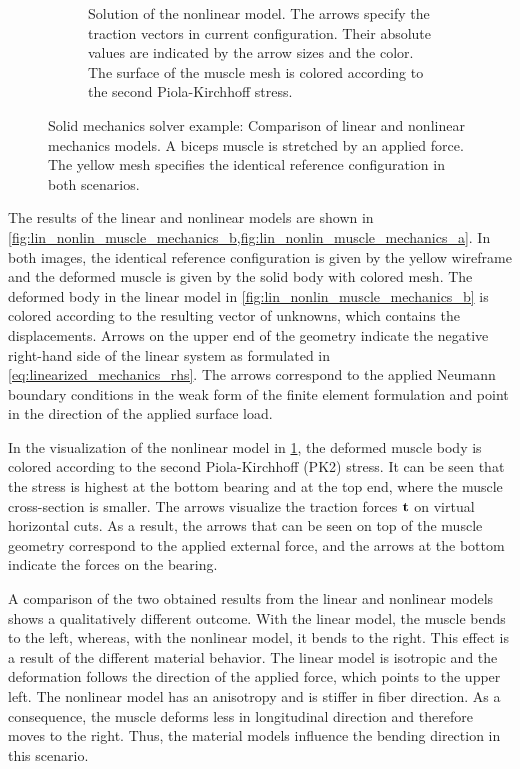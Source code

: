 \begin{figure}
\begin{subfigure}[t]{0.4\textwidth}
    \caption{Solution of the nonlinear model. The arrows specify the traction vectors in current configuration.  Their absolute values are indicated by the arrow sizes and the color. The surface of the muscle mesh is colored according to the second Piola-Kirchhoff stress.}%
    \label{fig:lin_nonlin_muscle_mechanics_a}%
  \end{subfigure}
  \hfill
  \caption{Solid mechanics solver example: Comparison of linear and nonlinear mechanics models. A biceps muscle is stretched by an applied force. The yellow mesh specifies the identical reference configuration in both scenarios.}%
  \label{fig:lin_nonlin_muscle_mechanics}%
\end{figure}%

The results of the linear and nonlinear models are shown in \cref{fig:lin_nonlin_muscle_mechanics_b,fig:lin_nonlin_muscle_mechanics_a}. 
In both images, the identical reference configuration is given by the yellow wireframe and the deformed muscle is given by the solid body with colored mesh. 
The deformed body in the linear model in \cref{fig:lin_nonlin_muscle_mechanics_b} is colored according to the resulting vector of unknowns, which contains the displacements.  Arrows on the upper end of the geometry indicate the negative right-hand side of the linear system as formulated in \cref{eq:linearized_mechanics_rhs}. The arrows correspond to the applied Neumann boundary conditions in the weak form of the finite element formulation and point in the direction of the applied surface load.

In the visualization of the nonlinear model in \cref{fig:lin_nonlin_muscle_mechanics_a}, the deformed muscle body is colored according to the second Piola-Kirchhoff (PK2) stress. It can be seen that the stress is highest at the bottom bearing and at the top end, where the muscle cross-section is smaller. The arrows visualize the traction forces $\textbf{t}$ on virtual horizontal cuts. As a result, the arrows that can be seen on top of the muscle geometry correspond to the applied external force, and the arrows at the bottom indicate the forces on the bearing.

A comparison of the two obtained results from the linear and nonlinear models shows a qualitatively different outcome. With the linear model, the muscle bends to the left, whereas, with the nonlinear model, it bends to the right. This effect is a result of the different material behavior. The linear model is isotropic and the deformation follows the direction of the applied force, which points to the upper left. The nonlinear model has an anisotropy and is stiffer in fiber direction. As a consequence, the muscle deforms less in longitudinal direction and therefore moves to the right.
Thus, the material models influence the bending direction in this scenario.

